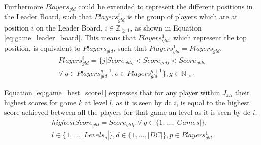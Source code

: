 Furthermore $Players_{gld}$ could be extended to represent the different positions in the Leader Board, such that $Players^{i}_{gld}$ is the group of players which are at position $i$ on the Leader Board, $i \in \mathbb{Z}_{\ge 1}$, as shown in Equation \ref{eq:game_leader_board}. This means that $Players^{1}_{gld}$, which represent the top position, is equivalent to $Players_{gld}$, such that $Players^{1}_{gld} = Players_{gld}$.
\begin{multline} \label{eq:game_leader_board}
	Players^{i}_{gld} = \{j | Score_{gldq} < Score_{gldj} < Score_{gldo}\\ \forall ~ q \in Players^{g-1}_{gld}, o \in Players^{g+1}_{gld}\}, g \in \mathbb{N}_{> 1}
\end{multline}

Equation \ref{eq:game_best_score1} expresses that for any player within $J_{kli}$ their highest scores for game $k$ at level $l$, as it is seen by \gls{dc} $i$, is equal to the highest score achieved between all the players for that game an level as it is seen by \gls{dc} $i$.
\begin{multline} \label{eq:game_best_score1}
	highestScore_{gld} = Score_{gldp} ~ \forall ~ g \in \{1,\dots, |Games|\},\\ l \in \{1,\dots, |Levels_{g}|\}, d \in \{1,\dots, |DC|\}, p \in Players^{1}_{gld}
\end{multline}

